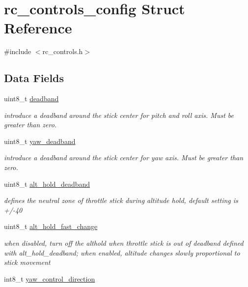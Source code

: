 \hypertarget{structrc__controls__config}{\section{rc\+\_\+controls\+\_\+config Struct Reference}
\label{structrc__controls__config}
}


{\ttfamily \#include $<$rc\+\_\+controls.\+h$>$}

\subsection*{Data Fields}
\begin{DoxyCompactItemize}
\item 
uint8\+\_\+t \hyperlink{structrc__controls__config_a64a198f55a884288e806aabef7dbb416}{deadband}
\begin{DoxyCompactList}\small\item\em introduce a deadband around the stick center for pitch and roll axis. Must be greater than zero. \end{DoxyCompactList}\item 
uint8\+\_\+t \hyperlink{structrc__controls__config_a0b251748dc937453076cf40936042266}{yaw\+\_\+deadband}
\begin{DoxyCompactList}\small\item\em introduce a deadband around the stick center for yaw axis. Must be greater than zero. \end{DoxyCompactList}\item 
uint8\+\_\+t \hyperlink{structrc__controls__config_ad837982fca562e3da75a4edf3af3a193}{alt\+\_\+hold\+\_\+deadband}
\begin{DoxyCompactList}\small\item\em defines the neutral zone of throttle stick during altitude hold, default setting is +/-\/40 \end{DoxyCompactList}\item 
uint8\+\_\+t \hyperlink{structrc__controls__config_aacfb7556a9db4d96e4b6e8b008aa4bef}{alt\+\_\+hold\+\_\+fast\+\_\+change}
\begin{DoxyCompactList}\small\item\em when disabled, turn off the althold when throttle stick is out of deadband defined with alt\+\_\+hold\+\_\+deadband; when enabled, altitude changes slowly proportional to stick movement \end{DoxyCompactList}\item 
int8\+\_\+t \hyperlink{structrc__controls__config_ad75b1c3890386c9bd1004a7ab39a384f}{yaw\+\_\+control\+\_\+direction}

\end{DoxyCompactItemize}
